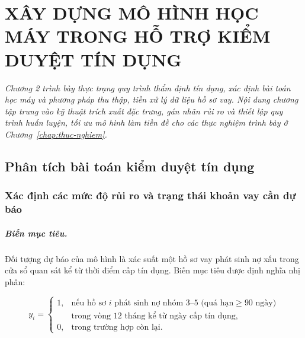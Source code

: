 \chapter{XÂY DỰNG MÔ HÌNH HỌC MÁY TRONG HỖ TRỢ KIỂM DUYỆT TÍN DỤNG}
\label{chap:xay-dung-he-thong}

\noindent\textit{Chương 2 trình bày thực trạng quy trình thẩm định tín dụng, xác
định bài toán học máy và phương pháp thu thập, tiền xử lý dữ liệu hồ sơ vay. Nội
dung chương tập trung vào kỹ thuật trích xuất đặc trưng, gán nhãn rủi ro và thiết
lập quy trình huấn luyện, tối ưu mô hình làm tiền đề cho các thực nghiệm trình
bày ở Chương~\ref{chap:thuc-nghiem}.}

\section{Phân tích bài toán kiểm duyệt tín dụng}
\label{sec:phan-tich-bai-toan}

\subsection{Xác định các mức độ rủi ro và trạng thái khoản vay cần dự báo}
\label{subsec:muc-do-rui-ro}

\paragraph{Biến mục tiêu.} Đối tượng dự báo của mô hình là xác suất một hồ sơ
vay phát sinh nợ xấu trong cửa sổ quan sát kể từ thời điểm cấp tín dụng. Biến mục
tiêu được định nghĩa nhị phân:

\begin{equation}
y_i =
\begin{cases}
1, & \text{nếu hồ sơ } i \text{ phát sinh nợ nhóm 3--5 (quá hạn} \ge 90 \text{ ngày)} \\
   & \text{trong vòng 12 tháng kể từ ngày cấp tín dụng,} \\[4pt]
0, & \text{trong trường hợp còn lại.}
\end{cases}
\label{eq:target}
\end{equation}

